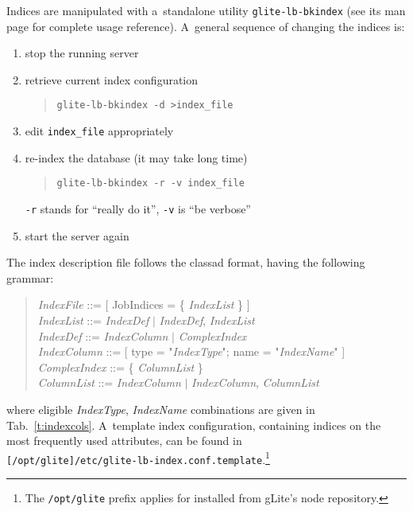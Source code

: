Indices are manipulated with a~standalone utility \verb'glite-lb-bkindex'
(see its man page for complete usage reference).
A~general sequence of changing the indices is:
\begin{enumerate}
\item stop the running server
\item retrieve current index configuration
\begin{quote}
\verb'glite-lb-bkindex -d >index_file'
\end{quote}
\item edit \verb'index_file' appropriately
\item re-index the database (it may take long time)
\begin{quote}
\verb'glite-lb-bkindex -r -v index_file'
\end{quote}
\verb'-r' stands for ``really do it'', \verb'-v' is ``be verbose''
\item start the server again
\end{enumerate}

The index description file follows the classad format, having the following grammar:
\begin{quote}
\emph{IndexFile} ::= [ JobIndices = \{ \emph{IndexList} \} ] \\
\emph{IndexList} ::= \emph{IndexDef} $|$ \emph{IndexDef}, \emph{IndexList} \\
\emph{IndexDef} ::= \emph{IndexColumn} $|$ \emph{ComplexIndex} \\
\emph{IndexColumn} ::= [ type = "\emph{IndexType}"; name = "\emph{IndexName}" ]\\
\emph{ComplexIndex} ::= \{ \emph{ColumnList} \} \\
\emph{ColumnList} ::= \emph{IndexColumn} $|$ \emph{IndexColumn}, \emph{ColumnList}
\end{quote}

where eligible \emph{IndexType}, \emph{IndexName} combinations are given
in Tab.~\ref{t:indexcols}.
A~template index configuration, containing indices on the most frequently
used attributes, can be found in\\ \texttt{[/opt/glite]/etc/glite-lb-index.conf.template}.\footnote{The \texttt{/opt/glite} prefix applies for \LB installed from gLite's \LB node repository.} 


